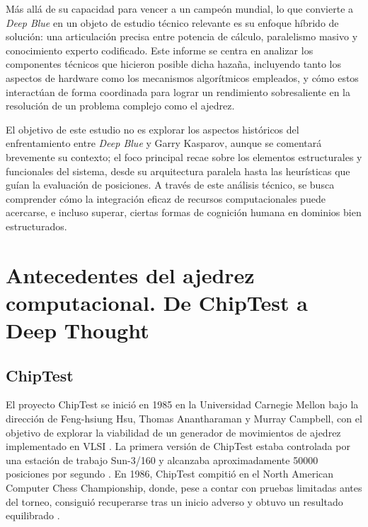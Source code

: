 \documentclass[a4paper, 12pt]{article}
\begin{document}
Más allá de su capacidad para vencer a un campeón mundial, lo 
que convierte a \textit{Deep Blue} en un objeto de estudio 
técnico relevante es su enfoque híbrido de solución: una 
articulación precisa entre potencia de cálculo, paralelismo 
masivo y conocimiento experto codificado. Este informe se centra 
en analizar los componentes técnicos que hicieron posible dicha 
hazaña, incluyendo tanto los aspectos de hardware como los 
mecanismos algorítmicos empleados, y cómo estos interactúan de 
forma coordinada para lograr un rendimiento sobresaliente en la 
resolución de un problema complejo como el ajedrez.

El objetivo de este estudio no es explorar los aspectos 
históricos del enfrentamiento entre \textit{Deep Blue} y Garry 
Kasparov, aunque se comentará brevemente su contexto; el foco 
principal recae sobre los elementos estructurales y funcionales 
del sistema, desde su arquitectura paralela hasta las 
heurísticas que guían la evaluación de posiciones. A través de 
este análisis técnico, se busca comprender cómo la integración 
eficaz de recursos computacionales puede acercarse, e incluso 
superar, ciertas formas de cognición humana en dominios bien 
estructurados.


\newpage


\section{Antecedentes del ajedrez computacional. De ChipTest a Deep Thought}

\subsection{ChipTest}
El proyecto ChipTest se inició en 1985 en la Universidad 
Carnegie Mellon bajo la dirección de Feng-hsiung Hsu, Thomas 
Anantharaman y Murray Campbell, con el objetivo de explorar la 
viabilidad de un generador de movimientos de ajedrez 
implementado en VLSI \cite{Hsu1988}. La primera versión de 
ChipTest estaba controlada por una estación de trabajo 
Sun-3/160 y alcanzaba aproximadamente 50000 posiciones por 
segundo \cite{Hsu1988}. En 1986, ChipTest compitió en el North 
American Computer Chess Championship, donde, pese a contar con 
pruebas limitadas antes del torneo, consiguió recuperarse tras 
un inicio adverso y obtuvo un resultado equilibrado 
\cite{Hsu1988}.
\end{document}
